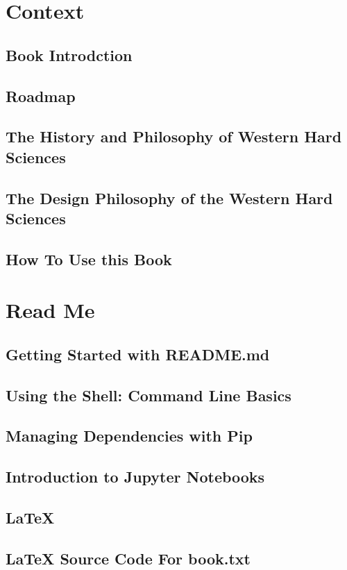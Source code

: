 \chapter{Context}
\section{Book Introdction}
\section{Roadmap}
\section{The History and Philosophy of Western Hard Sciences}
\section{The Design Philosophy of the Western Hard Sciences}
\section{How To Use this Book}


\chapter{Read Me}
\section{Getting Started with README.md}
\section{Using the Shell: Command Line Basics}
\section{Managing Dependencies with Pip}
\section{Introduction to Jupyter Notebooks}
\section{LaTeX}
\section{LaTeX Source Code For book.txt}

